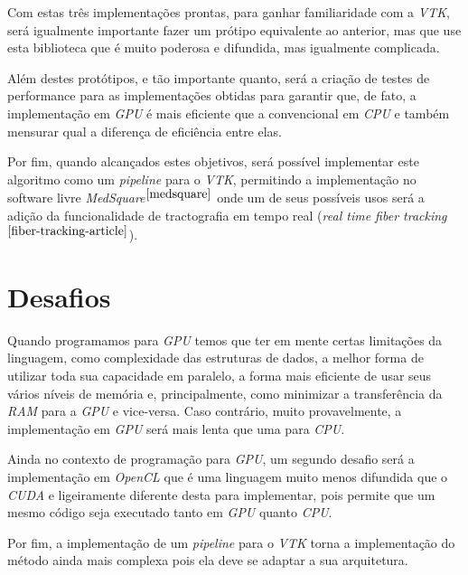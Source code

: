 Com estas três implementações prontas, para ganhar familiaridade com a \textit{VTK}, será igualmente importante fazer um prótipo equivalente ao anterior, mas que use esta biblioteca que é muito poderosa e difundida, mas igualmente complicada.

Além destes protótipos, e tão importante quanto, será a criação de testes de performance para as implementações obtidas para garantir que, de fato, a implementação em \textit{GPU} é mais eficiente que a convencional em \textit{CPU} e também mensurar qual a diferença de eficiência entre elas.

Por fim, quando alcançados estes objetivos, será possível implementar este algoritmo como um \textit{pipeline} para o \textit{VTK}, permitindo a implementação no software livre \textit{MedSquare}$^{\ref{medsquare}}$ onde um de seus possíveis usos será a adição da funcionalidade de tractografia em tempo real (\textit{real time fiber tracking}$^{\ref{fiber-tracking-article}}$).

\section{Desafios}
Quando programamos para \textit{GPU} temos que ter em mente certas limitações da linguagem, como complexidade das estruturas de dados, a melhor forma de utilizar toda sua capacidade em paralelo, a forma mais eficiente de usar seus vários níveis de memória e, principalmente, como minimizar a transferência da \textit{RAM} para a \textit{GPU} e vice-versa. Caso contrário, muito provavelmente, a implementação em \textit{GPU} será mais lenta que uma para \textit{CPU}.

Ainda no contexto de programação para \textit{GPU}, um segundo desafio será a implementação em \textit{OpenCL} que é uma linguagem muito menos difundida que o \textit{CUDA} e ligeiramente diferente desta para implementar, pois permite que um mesmo código seja executado tanto em \textit{GPU} quanto \textit{CPU}.

Por fim, a implementação de um \textit{pipeline} para o \textit{VTK} torna a implementação do método ainda mais complexa pois ela deve se adaptar a sua arquitetura.

